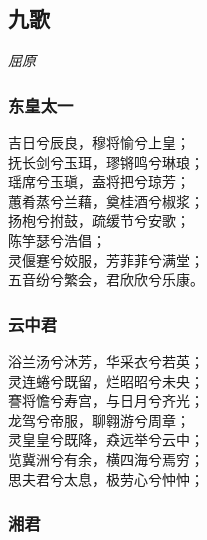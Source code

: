 \documentclass[]{article}
\begin{document}
\hypertarget{header-n11}{%
\subsection{九歌}\label{header-n11}}

\emph{屈原}

\hypertarget{header-n16}{%
\subsubsection{东皇太一}\label{header-n16}}

吉日兮辰良，穆将愉兮上皇；\\
抚长剑兮玉珥，璆锵鸣兮琳琅；\\
瑶席兮玉瑱，盍将把兮琼芳；\\
蕙肴蒸兮兰藉，奠桂酒兮椒浆；\\
扬枹兮拊鼓，疏缓节兮安歌；\\
陈竽瑟兮浩倡；\\
灵偃蹇兮姣服，芳菲菲兮满堂；\\
五音纷兮繁会，君欣欣兮乐康。

\hypertarget{header-n21}{%
\subsubsection{云中君}\label{header-n21}}

浴兰汤兮沐芳，华采衣兮若英；\\
灵连蜷兮既留，烂昭昭兮未央；\\
謇将憺兮寿宫，与日月兮齐光；\\
龙驾兮帝服，聊翱游兮周章；\\
灵皇皇兮既降，猋远举兮云中；\\
览冀洲兮有余，横四海兮焉穷；\\
思夫君兮太息，极劳心兮忡忡；

\hypertarget{header-n26}{%
\subsubsection{湘君}\label{header-n26}}
\end{document}
